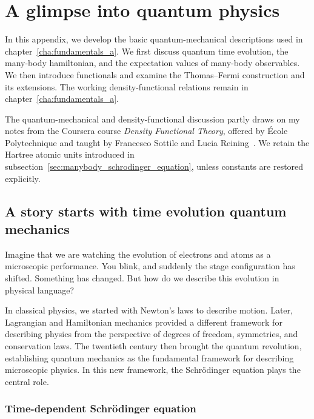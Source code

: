 \chapter{A glimpse into quantum physics}
\label{cha:appendix_quantum}

In this appendix, we develop the basic quantum-mechanical descriptions used in chapter~\ref{cha:fundamentals_a}.
We first discuss quantum time evolution, the many-body hamiltonian, and the expectation values of many-body observables.
We then introduce functionals and examine the Thomas--Fermi construction and its extensions.
The working density-functional relations remain in chapter~\ref{cha:fundamentals_a}.

The quantum-mechanical and density-functional discussion partly draws on my notes from the Coursera course \textit{Density Functional Theory}, offered by École Polytechnique and taught by Francesco Sottile and Lucia Reining~\cite{sottile_reining_dft_coursera}.
We retain the Hartree atomic units introduced in subsection~\ref{sec:manybody_schrodinger_equation}, unless constants are restored explicitly.

\newpage
\FloatBarrier
\section{A story starts with time evolution quantum mechanics}
\label{sec:time_evolution_quantum_mechanics}

Imagine that we are watching the evolution of electrons and atoms as a microscopic performance.
You blink, and suddenly the stage configuration has shifted.
Something has changed. But how do we describe this evolution in physical language?

In classical physics, we started with Newton's laws to describe motion.
Later, Lagrangian and Hamiltonian mechanics provided a different framework for describing physics from the perspective of degrees of freedom, symmetries, and conservation laws.
The twentieth century then brought the quantum revolution, establishing quantum mechanics as the fundamental framework for describing microscopic physics.
In this new framework, the Schrödinger equation plays the central role.

\FloatBarrier
\subsection{Time-dependent Schrödinger equation}

